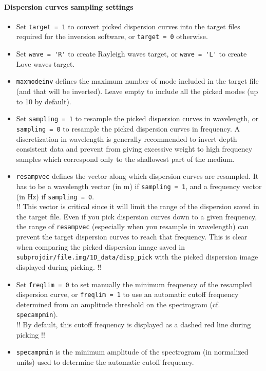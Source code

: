 \documentclass[twoside,a4paper]{article}
\begin{document}
\paragraph{Dispersion curves sampling settings}
\begin{itemize}[leftmargin=*]
\setlength\itemsep{2ex}
\item Set \verb|target = 1| to convert picked dispersion curves into the target files required for the inversion software, or \verb|target = 0| otherwise.

\item Set \verb|wave = 'R'| to create Rayleigh waves target, or \verb|wave = 'L'| to create Love waves target.

\item \verb|maxmodeinv| defines the maximum number of mode included in the target file (and that will be inverted). Leave empty to include all the picked modes (up to 10 by default).

\item Set \verb|sampling = 1| to resample the picked dispersion curves in wavelength, or \verb|sampling = 0| to resample the picked dispersion curves in frequency. A discretization in wavelength is generally recommended to invert depth consistent data and prevent from giving excessive weight to high frequency samples which correspond only to the shallowest part of the medium.

\item \verb|resampvec| defines the vector along which dispersion curves are resampled. It has to be a wavelength vector (in m) if \verb|sampling = 1|, and a frequency vector (in Hz) if \verb|sampling = 0|.\\[1ex]
!! This vector is critical since it will limit the range of the dispersion saved in the target file. Even if you pick dispersion curves down to a given frequency, the range of \verb|resampvec| (especially when you resample in wavelength) can prevent the target dispersion curves to reach that frequency. This is clear when comparing the picked dispersion image saved in \verb|subprojdir/file.img/1D_data/disp_pick| with the picked dispersion image displayed during picking. !!

\item Set \verb|freqlim = 0| to set manually the minimum frequency of the resampled dispersion curve, or \verb|freqlim = 1| to use an automatic cutoff frequency determined from an amplitude threshold on the spectrogram (cf. \verb|specampmin|).\\[1ex]
!! By default, this cutoff frequency is displayed as a dashed red line during picking !!

\item \verb|specampmin| is the minimum amplitude of the spectrogram (in normalized units) used to determine the automatic cutoff frequency.\\[1ex]
\end{itemize}
\end{document}
